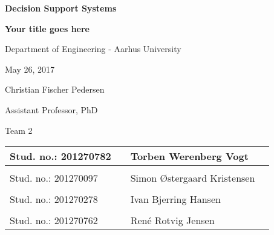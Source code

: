 
\centerline{\Huge\bfseries\color{ThemeColor} Decision Support Systems}

\vspace{1em}
\centerline{\Large\bfseries\color{BlackColor} Your title goes here}

\vspace{5em}
\centerline{\large\bfseries\color{BlackColor}}
\vspace{0.5em}
\centerline{\large\color{BlackColor}Department of Engineering - Aarhus University}

\vspace{0.5em}
\centerline{\large\color{BlackColor} May 26, 2017}

\vspace{5em}
\centerline{\large\color{BlackColor} Christian Fischer Pedersen}
\vspace{0.5em}
\centerline{\large\color{BlackColor} Assistant Professor, PhD}

\vspace{5em}
\centerline{\large\color{BlackColor} Team 2}


\vspace{25em}

\begin{center}
   \begin{tabular}{ l p{3cm} l l }
    Stud. no.: 201270782 && Torben Werenberg Vogt & \\\hline
	& & \\
	Stud. no.: 201270097 && Simon Østergaard Kristensen & \\\hline
	& & \\
	Stud. no.: 201270278 && Ivan Bjerring Hansen & \\\hline
	& & \\
   Stud. no.: 201270762 && René Rotvig Jensen & \\\hline
   \end{tabular}
\end{center}
\thispagestyle{empty} %
\restoregeometry

